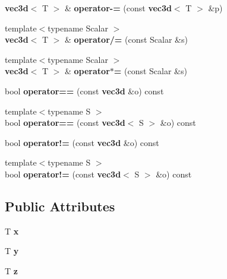\begin{DoxyCompactItemize}
\item 
{\bf vec3d}$<$ T $>$ \& {\bfseries operator-\/=} (const {\bf vec3d}$<$ T $>$ \&p)\label{structmath3d_1_1vec3d_a46ad32e1f627711c2a5b41e8b422f478}

\item 
{\footnotesize template$<$typename Scalar $>$ }\\{\bf vec3d}$<$ T $>$ \& {\bfseries operator/=} (const Scalar \&s)\label{structmath3d_1_1vec3d_aa926acf0369aec45764ccafb9bd558f2}

\item 
{\footnotesize template$<$typename Scalar $>$ }\\{\bf vec3d}$<$ T $>$ \& {\bfseries operator$\ast$=} (const Scalar \&s)\label{structmath3d_1_1vec3d_a8ffd24431fd760005b86441785b7e185}

\item 
bool {\bfseries operator==} (const {\bf vec3d} \&o) const \label{structmath3d_1_1vec3d_a5a48e2e4b8b8610bc150b43a1bc2df85}

\item 
{\footnotesize template$<$typename S $>$ }\\bool {\bfseries operator==} (const {\bf vec3d}$<$ S $>$ \&o) const \label{structmath3d_1_1vec3d_a1038bc63be74743e5a0c1bbd5eedb2fc}

\item 
bool {\bfseries operator!=} (const {\bf vec3d} \&o) const \label{structmath3d_1_1vec3d_ad48a0d16ea0068cc2598c110f5b81ae8}

\item 
{\footnotesize template$<$typename S $>$ }\\bool {\bfseries operator!=} (const {\bf vec3d}$<$ S $>$ \&o) const \label{structmath3d_1_1vec3d_a6af146242ea5902c06aa1ad2a658ce8f}

\end{DoxyCompactItemize}
\subsection*{Public Attributes}
\begin{DoxyCompactItemize}
\item 
T {\bfseries x}\label{structmath3d_1_1vec3d_a1065770533920946d1bf3a8f831da3fe}

\item 
T {\bfseries y}\label{structmath3d_1_1vec3d_abe4b25501b8a64362041ae1430f78437}

\item 
T {\bfseries z}\label{structmath3d_1_1vec3d_aaccba4853c63f6cc8e9978eb537c347f}

\end{DoxyCompactItemize}
